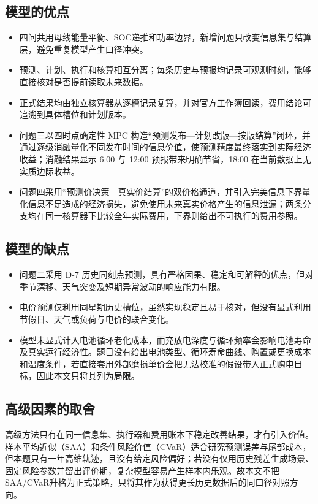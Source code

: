 \documentclass[withoutpreface,bwprint]{cumcmthesis}
\begin{document}
\subsection{模型的优点}
\begin{itemize}[itemindent=2em]
\item 四问共用母线能量平衡、SOC递推和功率边界，新增问题只改变信息集与结算层，避免重复模型产生口径冲突。
\item 预测、计划、执行和核算相互分离；每条历史与预报均记录可观测时刻，能够直接核对是否提前读取未来数据。
\item 正式结果均由独立核算器从逐槽记录复算，并对官方工作簿回读，费用结论可追溯到具体槽位和计划版本。
\item 问题三以四时点确定性 MPC 构造“预测发布—计划改版—按版结算”闭环，并通过逐级消融量化不同发布时间的信息价值，使预测精度最终落实到实际经济收益；消融结果显示 6:00 与 12:00 预报带来明确节省，18:00 在当前数据上无实质边际收益。
\item 问题四采用“预测价决策—真实价结算”的双价格通道，并引入完美信息下界量化信息不足造成的经济损失，避免使用未来真实价格产生的信息泄漏；两条分支均在同一核算器下比较全年实际费用，下界则给出不可执行的费用参照。
\end{itemize}

\subsection{模型的缺点}
\begin{itemize}[itemindent=2em]
\item 问题二采用 D-7 历史同刻点预测，具有严格因果、稳定和可解释的优点，但对季节漂移、天气突变及短期异常波动的响应能力有限。
\item 电价预测仅利用同星期历史槽位，虽然实现稳定且易于核对，但没有显式利用节假日、天气或负荷与电价的联合变化。
\item 模型未显式计入电池循环老化成本，而充放电深度与循环频率会影响电池寿命及真实运行经济性\cite{xu2018aging}。题目没有给出电池类型、循环寿命曲线、购置或更换成本和温度条件，若直接套用外部磨损单价会把无法校准的假设带入正式购电目标，因此本文只将其列为局限。
\end{itemize}

\subsection{高级因素的取舍}

高级方法只有在同一信息集、执行器和费用账本下稳定改善结果，才有引入价值。样本平均近似（SAA）和条件风险价值（CVaR）适合研究预测误差与尾部成本，但本题只有一年高维轨迹，且没有给定风险偏好；若没有仅用历史残差生成场景、固定风险参数并留出评价期，复杂模型容易产生样本内乐观。故本文不把SAA/CVaR升格为正式策略，只将其作为获得更长历史数据后的同口径对照方向。
\end{document}
